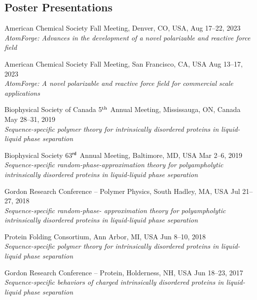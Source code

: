 \documentclass[11pt]{../yhlcv}
\begin{document}
\subsection*{Poster Presentations}
\begin{etaremune}[leftmargin=0.26in]
\item American Chemical Society Fall Meeting, Denver, CO, USA, \hfill {Aug 17--22, 2023}\\
	{\it AtomForge: Advances in the development of a novel polarizable and reactive force field}
	
\item American Chemical Society Fall Meeting, San Francisco, CA, USA \hfill {Aug 13--17, 2023}\\
	{\it AtomForge: A novel polarizable and reactive force field for commercial scale applications}

\item Biophysical Society of Canada 5$^{\rm th}$ Annual Meeting, Mississauga, ON, Canada \hfill {May 28--31, 2019}\\
	{\it Sequence-specific polymer theory for intrinsically disordered proteins in liquid-liquid phase separation}

\item Biophysical Society 63$^{\sf rd}$  Annual Meeting, Baltimore, MD, USA \hfill {Mar 2--6, 2019}\\
	{\it Sequence-specific random-phase-approximation theory for polyampholytic intrinsically disordered 
	proteins in liquid-liquid phase separation}

\item Gordon Research Conference -- Polymer Physics, South Hadley, MA, USA \hfill {Jul 21--27, 2018}\\
	{\it Sequence-specific random-phase- approximation theory for polyampholytic intrinsically disordered 
	proteins in liquid-liquid phase separation}

\item Protein Folding Consortium, Ann Arbor, MI, USA \hfill 	{Jun 8--10, 2018}\\
	{\it Sequence-specific polymer theory for intrinsically disordered proteins in liquid-liquid phase separation}

\item Gordon Research Conference -- Protein, Holderness, NH, USA \hfill 	{Jun 18--23, 2017}\\
	{\it Sequence-specific behaviors of charged intrinsically disordered proteins in liquid-liquid phase separation}


\end{etaremune}
\end{document}
